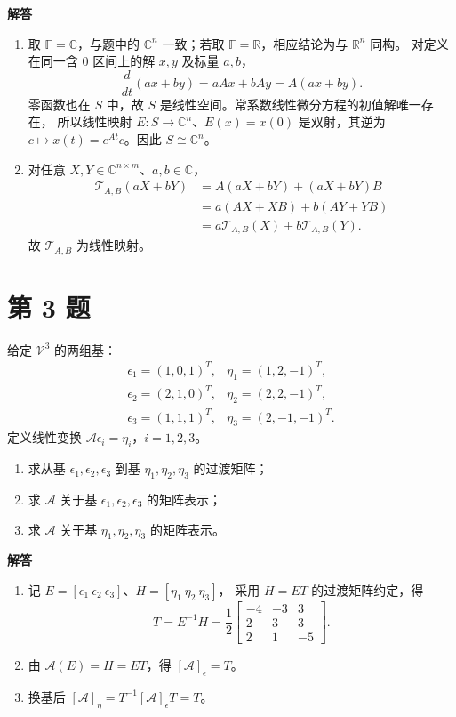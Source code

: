 \documentclass[UTF8,10pt,letterpaper,fontset=fandol]{ctexart}
\newcommand{\R}{\mathbb R}
\newcommand{\C}{\mathbb C}
\newcommand{\F}{\mathbb F}
\newcommand{\Solution}{\par\Needspace{5\baselineskip}\textbf{解答}\par}
\begin{document}
\Solution
\begin{enumerate}
\item 取 \(\F=\C\)，与题中的 \(\C^n\) 一致；若取 \(\F=\R\)，相应结论为与 \(\R^n\) 同构。
对定义在同一含 \(0\) 区间上的解 \(x,y\) 及标量 \(a,b\)，
\[
\frac{d}{dt}(ax+by)=aAx+bAy=A(ax+by).
\]
零函数也在 \(S\) 中，故 \(S\) 是线性空间。常系数线性微分方程的初值解唯一存在，
所以线性映射 \(E:S\to\C^n\)、\(E(x)=x(0)\) 是双射，其逆为
\(c\mapsto x(t)=e^{At}c\)。因此 \(\boxed{S\cong\C^n}\)。
\item 对任意 \(X,Y\in\C^{n\times m}\)、\(a,b\in\C\)，
\[
\begin{aligned}
\mathcal T_{A,B}(aX+bY)
&=A(aX+bY)+(aX+bY)B\\
&=a(AX+XB)+b(AY+YB)\\
&=a\mathcal T_{A,B}(X)+b\mathcal T_{A,B}(Y).
\end{aligned}
\]
故 \(\mathcal T_{A,B}\) 为线性映射。
\end{enumerate}

\section{第 3 题}
给定 \(\mathcal V^3\) 的两组基：
\[
\begin{array}{ll}
\epsilon_1=(1,0,1)^T,&\eta_1=(1,2,-1)^T,\\
\epsilon_2=(2,1,0)^T,&\eta_2=(2,2,-1)^T,\\
\epsilon_3=(1,1,1)^T,&\eta_3=(2,-1,-1)^T.
\end{array}
\]
定义线性变换 \(\mathcal A\epsilon_i=\eta_i\)，\(i=1,2,3\)。
\begin{enumerate}
\item 求从基 \(\epsilon_1,\epsilon_2,\epsilon_3\) 到基 \(\eta_1,\eta_2,\eta_3\) 的过渡矩阵；
\item 求 \(\mathcal A\) 关于基 \(\epsilon_1,\epsilon_2,\epsilon_3\) 的矩阵表示；
\item 求 \(\mathcal A\) 关于基 \(\eta_1,\eta_2,\eta_3\) 的矩阵表示。
\end{enumerate}

\Solution
\begin{enumerate}
\item 记 \(E=[\epsilon_1\ \epsilon_2\ \epsilon_3]\)、\(H=[\eta_1\ \eta_2\ \eta_3]\)，
采用 \(H=ET\) 的过渡矩阵约定，得
\[
\boxed{T=E^{-1}H=\frac12\begin{bmatrix}-4&-3&3\\2&3&3\\2&1&-5\end{bmatrix}}.
\]
\item 由 \(\mathcal A(E)=H=ET\)，得 \(\boxed{[\mathcal A]_{\epsilon}=T}\)。
\item 换基后 \(\boxed{[\mathcal A]_{\eta}=T^{-1}[\mathcal A]_{\epsilon}T=T}\)。
\end{enumerate}
\end{document}
